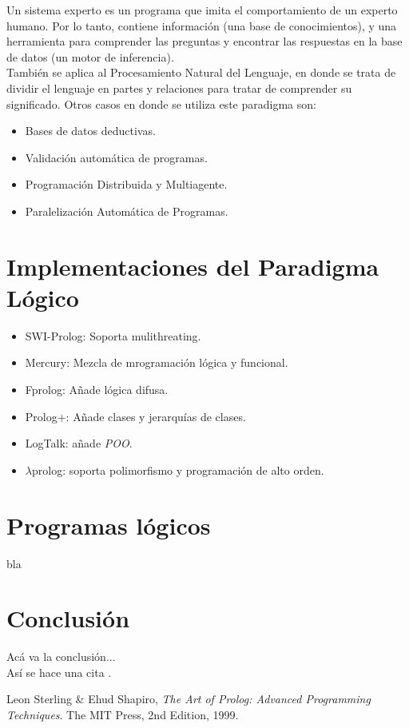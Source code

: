 \documentclass[12pt,titlepage]{article}
\begin{document}
Un sistema experto es un programa que imita el comportamiento de un experto humano. Por lo tanto, contiene información (una base de conocimientos), y una herramienta para comprender las preguntas y encontrar las respuestas en la base de datos (un motor de inferencia). \\

También se aplica al Procesamiento Natural del Lenguaje, en donde se trata de dividir el lenguaje en partes y relaciones para tratar de comprender su significado.
Otros casos en donde se utiliza este paradigma son: \\
\begin{itemize}
    \item Bases de datos deductivas.
    \item Validación automática de programas.
    \item Programación Distribuida y Multiagente.
    \item Paralelización Automática de Programas.
\end{itemize}

\newpage

\section{Implementaciones del Paradigma Lógico}

\begin{itemize}
    \item SWI-Prolog: Soporta mulithreating.
    \item Mercury: Mezcla de mrogramación lógica y funcional.
    \item Fprolog: Añade lógica difusa.
    \item Prolog+: Añade clases y jerarquías de clases.
    \item LogTalk: añade \textit{POO}.
    \item $\lambda$prolog: soporta polimorfismo y programación de alto orden.
\end{itemize}

\newpage
\section{Programas lógicos}
bla

\newpage
\section{Conclusión}
Acá va la conclusión... \\
Así se hace una cita \cite{artofprolog}.
	
\clearpage
\begin{thebibliography}{9}
   Leon Sterling \& Ehud Shapiro, \emph{The Art of Prolog: Advanced Programming Techniques}. The MIT Press, 2nd Edition, 1999.
\end{thebibliography}

\end{document}
